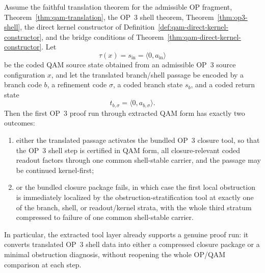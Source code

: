 \begin{theorem}\label{thm:qam-op3-proof-run}
Assume the faithful translation theorem for the admissible OP fragment, Theorem~\ref{thm:qam-translation}, the OP~3 shell theorem, Theorem~\ref{thm:op3-shell}, the direct kernel constructor of Definition~\ref{def:qam-direct-kernel-constructor}, and the bridge conditions of Theorem~\ref{thm:qam-direct-kernel-constructor}. Let
\[
\tau(x)=s_{\mathrm{in}}=\langle 0,a_{\mathrm{in}}\rangle
\]
be the coded QAM source state obtained from an admissible OP~3 source configuration $x$, and let the translated branch/shell passage be encoded by a branch code $b$, a refinement code $\sigma$, a coded branch state $s_b$, and a coded return state
\[
t_{b,\sigma}=\langle 0,a_{b,\sigma}\rangle.
\]
Then the first OP~3 proof run through extracted QAM form has exactly two outcomes:
\begin{enumerate}[leftmargin=2em,label=(\roman*)]
  \item either the translated passage activates the bundled OP~3 closure tool, so that the OP~3 shell step is certified in QAM form, all closure-relevant coded readout factors through one common shell-stable carrier, and the passage may be continued kernel-first;
  \item or the bundled closure package fails, in which case the first local obstruction is immediately localized by the obstruction-stratification tool at exactly one of the branch, shell, or readout/kernel strata, with the whole third stratum compressed to failure of one common shell-stable carrier.
\end{enumerate}
In particular, the extracted tool layer already supports a genuine proof run: it converts translated OP~3 shell data into either a compressed closure package or a minimal obstruction diagnosis, without reopening the whole OP/QAM comparison at each step.
\end{theorem}

